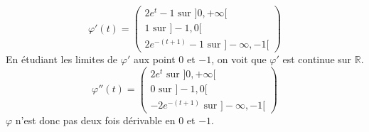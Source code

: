 {{$$\varphi'(t)=
\left( \begin{array}{c} 2e^t-1 \mbox{ sur } ]0,+\infty[ \\
1 \mbox{ sur } ]-1,0[ \\
2e^{-(t+1)}-1 \mbox{ sur } ]-\infty,-1[
\end{array} \right)$$
En \'etudiant les limites de $\varphi'$ aux point $0$ et $-1$, on
voit que $\varphi'$ est continue sur $\mathbb{R}$.
$$\varphi''(t)=
\left( \begin{array}{c} 2e^t \mbox{ sur } ]0,+\infty[ \\
0 \mbox{ sur } ]-1,0[ \\
-2e^{-(t+1)} \mbox{ sur } ]-\infty,-1[
\end{array} \right)$$ $\varphi$ n'est donc pas deux fois
d\'erivable en $0$ et $-1$.
}
}

